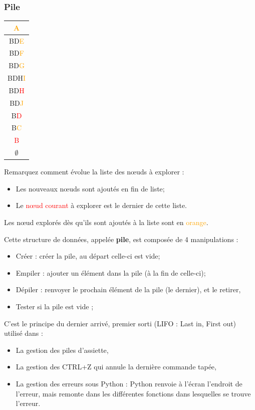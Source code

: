 \begin{frame}[fragile]
\frametitle{Pile}

\begin{minipage}{0.1\linewidth}
\begin{tabular}{|c|}
\hline
\textcolor{orange}{A} \\ \hline \textcolor{vertf}{BD}\textcolor{orange}{E}\\ \hline BD\textcolor{orange}{F}\\ \hline BD\textcolor{orange}{G}\\ \hline BD\textcolor{vertf}{H}\textcolor{orange}{I}\\ \hline BD\textcolor{red}{H}\\ \hline BD\textcolor{orange}{J}\\ \hline B\textcolor{red}{D} \\ \hline B\textcolor{orange}{C} \\ \hline \textcolor{red}{B} \\ \hline $\emptyset$ \\ \hline
\end{tabular}
\end{minipage}\hfill
\begin{minipage}{0.85\linewidth}
Remarquez comment évolue la liste des n\oe{}uds à explorer :
\begin{itemize}
\item Les \textcolor{vertf}{nouveaux n\oe{}uds} sont ajoutés en fin de liste;
\item Le \textcolor{red}{n\oe{}ud courant} à explorer est le dernier de cette liste.
\end{itemize}

Les n\oe{}ud explorés dès qu'ils sont ajoutés à la liste sont en \textcolor{orange}{orange}.

Cette structure de données, appelée \textbf{pile}, est composée de 4 manipulations :
\begin{itemize}
\item \og Créer \fg{} : créer la pile, au départ celle-ci est vide;
\item \og Empiler \fg{} : ajouter un élément dans la pile (à la fin de celle-ci); 
\item \og Dépiler \fg{} : renvoyer le prochain élément de la pile (le dernier), et le retirer,
\item \og Tester si la pile est vide \fg{};
\end{itemize}
\end{minipage}

C'est le principe du dernier arrivé, premier sorti (LIFO : Last in, First out) utilisé dans :\vspace{-0.3cm}
\begin{itemize}
\item La gestion des piles d'assiette,
\item La gestion des CTRL+Z qui annule la dernière commande tapée,
\item La gestion des erreurs sous Python : Python renvoie à l'écran l'endroit de l'erreur, mais remonte dans les différentes fonctions dans lesquelles se trouve l'erreur.
\end{itemize}
\end{frame}

